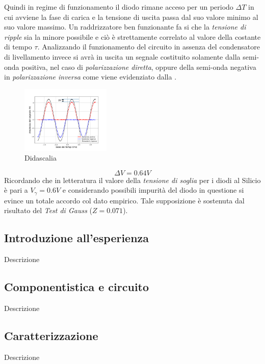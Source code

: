\documentclass[journal]{IEEEtran}
\begin{document}
Quindi in regime di funzionamento il diodo rimane acceso per un periodo $\Delta T$ in cui avviene la fase di carica e la tensione di uscita passa dal suo valore minimo al suo valore massimo. Un raddrizzatore ben funzionante fa si che la \textit{tensione di ripple} sia la minore possibile e ciò è strettamente correlato al valore della costante di tempo $\tau$.
Analizzando il funzionamento del circuito in assenza del condensatore di livellamento invece si avrà in uscita un segnale costituito solamente dalla semi-onda positiva, nel caso di \textit{polarizzazione diretta}, oppure della semi-onda negativa in \textit{polarizzazione inversa} come viene evidenziato dalla .
\begin{figure}[H]%
\begin {center}
\includegraphics[width=0.38\textwidth]{analysis/output/half-wave-rectifier.pdf}
\caption{Didascalia}
\label{fig:oscilloscope}
\end {center}
\end{figure}
\[\Delta V = 0.64 V \] 
Ricordando che in letteratura il valore della \textit{tensione di soglia} per i diodi al Silicio è pari a $V_{\gamma}=0.6V$ e considerando possibili impurità del diodo in questione si evince un totale accordo col dato empirico. Tale supposizione è sostenuta dal risultato del \textit{Test di Gauss} ($Z = 0.071$).




\subsection{\textbf{Introduzione all'esperienza}}
Descrizione

\subsection{\textbf{Componentistica e circuito}}
Descrizione

\subsection{\textbf{Caratterizzazione}}
Descrizione
\end{document}
